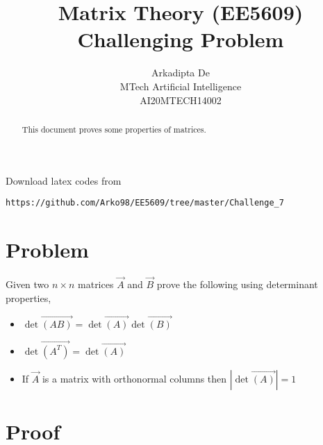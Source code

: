 \documentclass[journal,12pt,twocolumn]{IEEEtran}
\begin{document}
     \def\rightbox#1{\makebox[0in][r]{#1}}
     \def\centbox#1{\makebox[0in]{#1}}
     \def\topbox#1{\raisebox{-\baselineskip}[0in][0in]{#1}}
     \def\midbox#1{\raisebox{-0.5\baselineskip}[0in][0in]{#1}}
\vspace{3cm}
\title{Matrix Theory (EE5609) Challenging Problem}
\author{Arkadipta De\\MTech Artificial Intelligence\\AI20MTECH14002}
\maketitle
\newpage
\bigskip
\renewcommand{\thefigure}{\theenumi}
\renewcommand{\thetable}{\theenumi}
\begin{abstract}
This document proves some properties of matrices.
\end{abstract}
Download latex codes from 
%
\begin{lstlisting}
https://github.com/Arko98/EE5609/tree/master/Challenge_7
\end{lstlisting}
%
\section{Problem}
Given two $n \times n$ matrices $\vec{A}$ and $\vec{B}$ prove the following using determinant properties, 
\begin{itemize}
    \item $\det\vec{(AB)} = \det\vec{(A)}\det\vec{(B)}$
    \item $\det\vec{(A^T)} = \det\vec{(A)}$
    \item If $\vec{A}$ is a matrix with orthonormal columns then $|\det\vec{(A)}| = 1$
\end{itemize}
\section{Proof}
\end{document}
